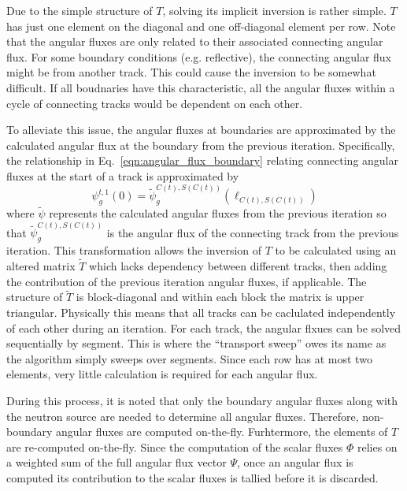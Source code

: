 Due to the simple structure of $T$, solving its implicit inversion is rather simple. $T$ has just one element on the diagonal and one off-diagonal element per row. Note that the angular fluxes are only related to their associated connecting angular flux. For some boundary conditions (e.g. reflective), the connecting angular flux might be from another track. This could cause the inversion to be somewhat difficult. If all boudnaries have this characteristic, all the angular fluxes within a cycle of connecting tracks would be dependent on each other.

To alleviate this issue, the angular fluxes at boundaries are approximated by the calculated angular flux at the boundary from the previous iteration. Specifically, the relationship in Eq.~\ref{eqn:angular_flux_boundary} relating connecting angular fluxes at the start of a track is approximated by
\begin{dmath}
	\psi_g^{t,1}(0) = \widetilde{\psi}_g^{C(t),S(C(t))}(\ell_{C(t),S(C(t))})
\end{dmath}
where $\widetilde{\psi}$ represents the calculated angular fluxes from the previous iteration so that $\widetilde{\psi}_g^{C(t),S(C(t))}$ is the angular flux of the connecting track from the previous iteration. This transformation allows the inversion of $T$ to be calculated using an altered matrix $\tilde{T}$ which lacks dependency between different tracks, then adding the contribution of the previous iteration angular fluxes, if applicable. The structure of $\tilde{T}$ is block-diagonal and within each block the matrix is upper triangular. Physically this means that all tracks can be caclulated independently of each other during an iteration. For each track, the angular flxues can be solved sequentially by segment. This is where the ``transport sweep'' owes its name as the algorithm simply sweeps over segments. Since each row has at most two elements, very little calculation is required for each angular flux. 

During this process, it is noted that only the boundary angular fluxes along with the neutron source are needed to determine all angular fluxes. Therefore, non-boundary angular fluxes are computed on-the-fly. Furhtermore, the elements of $T$ are re-computed on-the-fly. Since the computation of the scalar fluxes $\Phi$ relies on a weighted sum of the full angular flux vector $\Psi$, once an angular flux is computed its contribution to the scalar fluxes is tallied before it is discarded.

